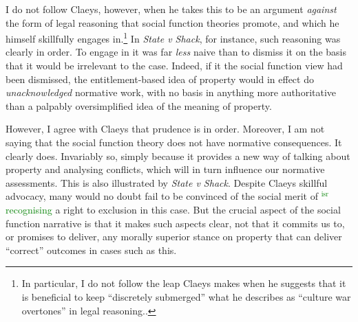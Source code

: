 \documentclass[12pt,a4paper]{book} %
\newcommand{\isr}[1]{\textcolor{green}{$^{\textrm{isr}}${#1}}}
\begin{document}
I do not follow Claeys, however, when he takes this to be an argument {\it against} the form of legal reasoning that social function theories promote, and which he himself skillfully engages in.\footnote{In particular, I do not follow the leap Claeys makes when he suggests that it is beneficial to keep ``discretely submerged'' what he describes as ``culture war overtones'' in legal reasoning.\cite[947]{claeys09}.} In {\it State v Shack}, for instance, such reasoning was clearly in order. To engage in it was far {\it less} naive than to dismiss it on the basis that it would be irrelevant to the case. Indeed, if it the social function view had been dismissed, the entitlement-based idea of property would in effect do {\it unacknowledged} normative work, with no basis in anything more authoritative than a palpably oversimplified idea of the meaning of property. 

However, I agree with Claeys that prudence is in order. Moreover, I am not saying that the social function theory does not have normative consequences. It clearly does. Invariably so, simply because it provides a new way of talking about property and analysing conflicts, which will in turn influence our normative assessments. This is also illustrated by {\it State v Shack}. Despite Claeys skillful advocacy, many would no doubt fail to be convinced of the social merit of \isr{recognising} a right to exclusion in this case. But the crucial aspect of the social function narrative is that it makes such aspects clear, not that it commits us to, or promises to deliver, any morally superior stance on property that can deliver ``correct'' outcomes in cases such as this.
\end{document}
